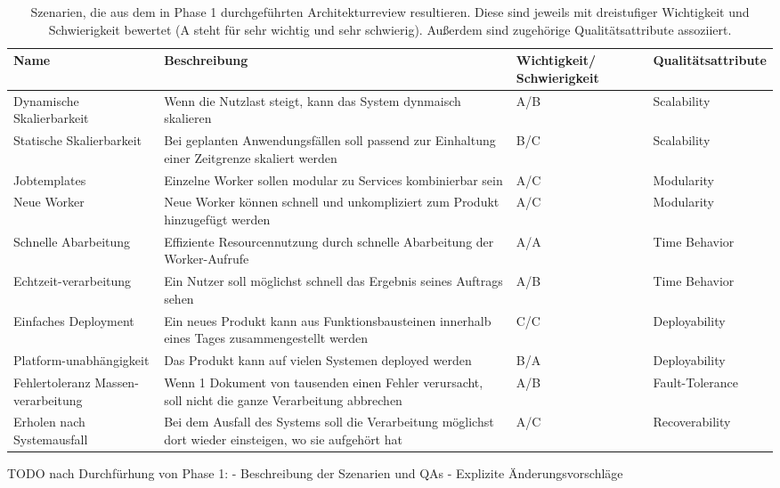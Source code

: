 \begin{table}
	\centering
	\begin{tabular}{ p{} p{6cm} p{2cm} l }
		\toprule
		\textbf{Name} & \textbf{Beschreibung} & \textbf{Wichtigkeit/ Schwierigkeit} & \textbf{Qualitätsattribute} \\
		\midrule
		Dynamische Skalierbarkeit & Wenn die Nutzlast steigt, kann das System dynmaisch skalieren & A/B & Scalability \\
		Statische Skalierbarkeit & Bei geplanten Anwendungsfällen soll passend zur Einhaltung einer Zeitgrenze skaliert werden & B/C & Scalability \\
		 Jobtemplates& Einzelne Worker sollen modular zu Services kombinierbar sein & A/C & Modularity \\
		 Neue Worker& Neue Worker können schnell und unkompliziert zum Produkt hinzugefügt werden & A/C & Modularity \\
		 Schnelle Abarbeitung & Effiziente Resourcennutzung durch schnelle Abarbeitung der Worker-Aufrufe  & A/A & Time Behavior \\
		 Echtzeit-verarbeitung & Ein Nutzer soll möglichst schnell das Ergebnis seines Auftrags sehen & A/B & Time Behavior \\
		 Einfaches Deployment & Ein neues Produkt kann aus Funktionsbausteinen innerhalb eines Tages zusammengestellt werden &C/C & Deployability \\
		 Platform-unabhängigkeit& Das Produkt kann auf vielen Systemen deployed werden & B/A & Deployability \\
		 Fehlertoleranz Massen-verarbeitung & Wenn 1 Dokument von tausenden einen Fehler verursacht, soll nicht die ganze Verarbeitung abbrechen & A/B & Fault-Tolerance\\
		 Erholen nach Systemausfall & Bei dem Ausfall des Systems soll die Verarbeitung möglichst dort wieder einsteigen, wo sie aufgehört hat & A/C & Recoverability \\
		\bottomrule
	\end{tabular}
	\caption{
		Szenarien, die aus dem in Phase 1 durchgeführten Architekturreview resultieren.
		Diese sind jeweils mit dreistufiger Wichtigkeit und Schwierigkeit bewertet (A steht für sehr wichtig und sehr schwierig).
		Außerdem sind zugehörige Qualitätsattribute assoziiert.
		}
	\label{tab:scenarios}
\end{table}

TODO nach Durchfürhung von Phase 1: 
 - Beschreibung der Szenarien und QAs
 - Explizite Änderungsvorschläge


